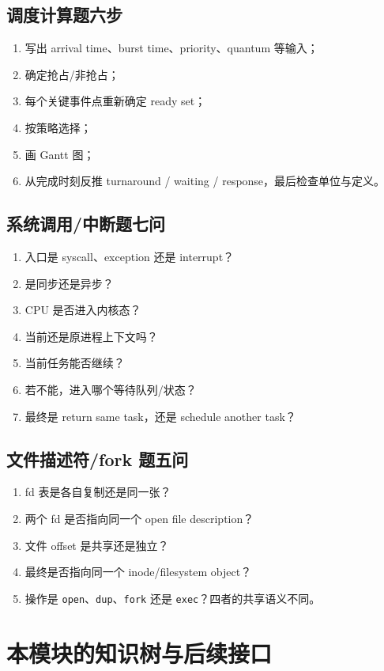 \documentclass[11pt,a4paper]{ctexart}
\newcommand{\code}[1]{\texttt{#1}}
\begin{document}
\subsection{调度计算题六步}
\begin{enumerate}
\item 写出 arrival time、burst time、priority、quantum 等输入；
\item 确定抢占/非抢占；
\item 每个关键事件点重新确定 ready set；
\item 按策略选择；
\item 画 Gantt 图；
\item 从完成时刻反推 turnaround / waiting / response，最后检查单位与定义。
\end{enumerate}

\subsection{系统调用/中断题七问}
\begin{enumerate}
\item 入口是 syscall、exception 还是 interrupt？
\item 是同步还是异步？
\item CPU 是否进入内核态？
\item 当前还是原进程上下文吗？
\item 当前任务能否继续？
\item 若不能，进入哪个等待队列/状态？
\item 最终是 return same task，还是 schedule another task？
\end{enumerate}

\subsection{文件描述符/fork 题五问}
\begin{enumerate}
\item fd 表是各自复制还是同一张？
\item 两个 fd 是否指向同一个 open file description？
\item 文件 offset 是共享还是独立？
\item 最终是否指向同一个 inode/filesystem object？
\item 操作是 \code{open}、\code{dup}、\code{fork} 还是 \code{exec}？四者的共享语义不同。
\end{enumerate}

\section{本模块的知识树与后续接口}
\end{document}
